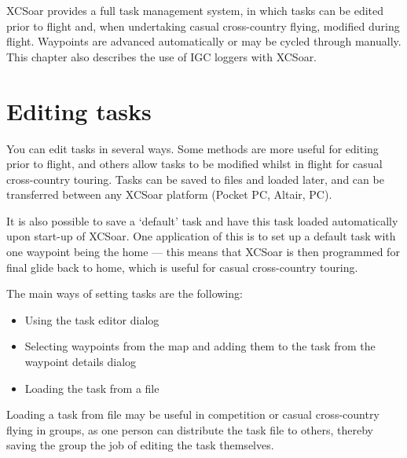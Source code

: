 \documentclass[a4paper,12pt]{refrep}
\begin{document}
XCSoar provides a full task management system, in which tasks can be
edited prior to flight and, when undertaking casual cross-country
flying, modified during flight.  Waypoints are advanced automatically
or may be cycled through manually.  This chapter also describes the
use of IGC loggers with XCSoar.

\section{Editing tasks}

You can edit tasks in several ways.  Some methods are more useful for
editing prior to flight, and others allow tasks to be modified whilst
in flight for casual cross-country touring.  Tasks can be saved to
files and loaded later, and can be transferred between any XCSoar
platform (Pocket PC, Altair, PC).

\tip It is also possible to save a `default' task and have this task loaded
automatically upon start-up of XCSoar.  One application of this is to
set up a default task with one waypoint being the home --- this means
that XCSoar is then programmed for final glide back to home, which is
useful for casual cross-country touring.

The main ways of setting tasks are the following:
\begin{itemize}
\item Using the task editor dialog
\item Selecting waypoints from the map and adding them to the task from the
 waypoint details dialog
\item Loading the task from a file
\end{itemize}

%

\tip Loading a task from file may be useful in competition or casual
cross-country flying in groups, as one person can distribute the task
file to others, thereby saving the group the job of editing the task
themselves.
\end{document}
